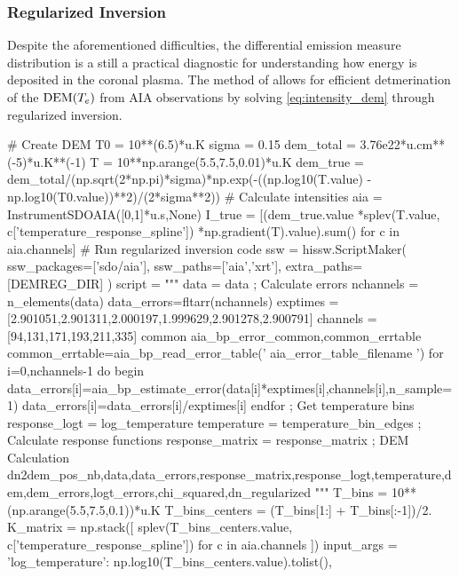 \subsubsection{Regularized Inversion}


Despite the aforementioned difficulties, the differential emission measure distribution is a still a practical diagnostic for understanding how energy is deposited in the coronal plasma. The method of \citet{hannah_differential_2012} allows for efficient detmerination of the $\textup{DEM}(T_e)$ from AIA observations by solving \autoref{eq:intensity_dem} through regularized inversion. 


\begin{pycode}
# Create DEM
T0 = 10**(6.5)*u.K
sigma = 0.15
dem_total = 3.76e22*u.cm**(-5)*u.K**(-1)
T = 10**np.arange(5.5,7.5,0.01)*u.K
dem_true = dem_total/(np.sqrt(2*np.pi)*sigma)*np.exp(-((np.log10(T.value) - np.log10(T0.value))**2)/(2*sigma**2))
# Calculate intensities
aia = InstrumentSDOAIA([0,1]*u.s,None)
I_true = [(dem_true.value
           *splev(T.value, c['temperature_response_spline'])
           *np.gradient(T).value).sum()
          for c in aia.channels]
# Run regularized inversion code
ssw = hissw.ScriptMaker(
    ssw_packages=['sdo/aia'],
    ssw_paths=['aia','xrt'],
    extra_paths=[DEMREG_DIR]
)
script = """
data = {{data}}
; Calculate errors
nchannels = n_elements(data)
data_errors=fltarr(nchannels)
exptimes = [2.901051,2.901311,2.000197,1.999629,2.901278,2.900791]
channels = [94,131,171,193,211,335]
common aia_bp_error_common,common_errtable
common_errtable=aia_bp_read_error_table('{{ aia_error_table_filename }}')
for i=0,nchannels-1 do begin
    data_errors[i]=aia_bp_estimate_error(data[i]*exptimes[i],channels[i],n_sample=1)
    data_errors[i]=data_errors[i]/exptimes[i]
endfor
; Get temperature bins
response_logt = {{log_temperature}}
temperature = {{temperature_bin_edges}}
; Calculate response functions
response_matrix = {{ response_matrix }}
; DEM Calculation
dn2dem_pos_nb,data,data_errors,response_matrix,response_logt,temperature,dem,dem_errors,logt_errors,chi_squared,dn_regularized
"""
T_bins = 10**(np.arange(5.5,7.5,0.1))*u.K
T_bins_centers = (T_bins[1:] + T_bins[:-1])/2.
K_matrix = np.stack([
    splev(T_bins_centers.value, c['temperature_response_spline']) for c in aia.channels
])
input_args =  {
    'log_temperature': np.log10(T_bins_centers.value).tolist(),
}
\end{pycode}
